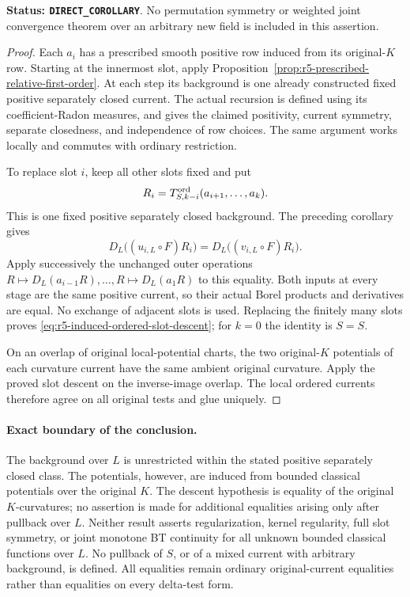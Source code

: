 \documentclass[11pt,a4paper]{article}
\numberwithin{equation}{section}
\theoremstyle{definition}
\theoremstyle{remark}
\begin{document}
\noindent\textbf{Status: \texttt{DIRECT\_COROLLARY}}.  No
permutation symmetry or weighted joint convergence theorem over
an arbitrary new field is included in this assertion.

\begin{proof}
Each $a_i$ has a prescribed smooth positive row induced from
its original-$K$ row.  Starting at the innermost slot, apply
Proposition~\ref{prop:r5-prescribed-relative-first-order}.
At each step its background is one already constructed fixed
positive separately closed current.  The actual recursion is
defined using its coefficient-Radon measures, and gives the
claimed positivity, current symmetry, separate closedness,
and independence of row choices.  The same argument works
locally and commutes with ordinary restriction.

To replace slot $i$, keep all other slots fixed and put
\[
 R_i=T^{\rm ord}_{S,k-i}(a_{i+1},\ldots,a_k).
\]
This is one fixed positive separately closed background.
The preceding corollary gives
\[
 D_L\bigl((u_{i,L}\circ F)R_i\bigr)
       =D_L\bigl((v_{i,L}\circ F)R_i\bigr).
\]
Apply successively the unchanged outer operations
$R\mapsto D_L(a_{i-1}R),\ldots,R\mapsto D_L(a_1R)$
to this equality.  Both inputs at every stage are the same
positive current, so their actual Borel products and derivatives
are equal.  No exchange of adjacent slots is used.  Replacing
the finitely many slots proves
\eqref{eq:r5-induced-ordered-slot-descent}; for $k=0$ the
identity is $S=S$.

On an overlap of original local-potential charts, the two
original-$K$ potentials of each curvature current have the same
ambient original curvature.  Apply the proved slot descent
on the inverse-image overlap.  The local ordered currents
therefore agree on all original tests and glue uniquely.
\end{proof}

\paragraph{Exact boundary of the conclusion.}
The background over $L$ is unrestricted within the stated
positive separately closed class.  The potentials, however,
are induced from bounded classical potentials over the original
$K$.  The descent hypothesis is equality of the original
$K$-curvatures; no assertion is made for additional equalities
arising only after pullback over $L$.
Neither result asserts regularization, kernel regularity,
full slot symmetry, or joint monotone BT continuity for all
unknown bounded classical functions over $L$.  No pullback
of $S$, or of a mixed current with arbitrary background, is
defined.  All equalities remain ordinary original-current
equalities rather than equalities on every delta-test form.
\end{document}
